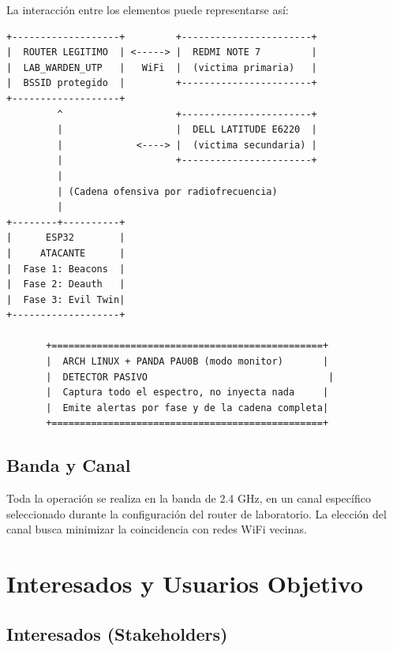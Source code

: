 \documentclass[11pt,a4paper]{article}
\begin{document}
La interacción entre los elementos puede representarse así:

\vspace{0.3cm}
\begin{verbatim}
+-------------------+         +-----------------------+
|  ROUTER LEGITIMO  | <-----> |  REDMI NOTE 7         |
|  LAB_WARDEN_UTP   |   WiFi  |  (victima primaria)   |
|  BSSID protegido  |         +-----------------------+
+-------------------+
         ^                    +-----------------------+
         |                    |  DELL LATITUDE E6220  |
         |             <----> |  (victima secundaria) |
         |                    +-----------------------+
         |
         | (Cadena ofensiva por radiofrecuencia)
         |
+--------+----------+
|      ESP32        |
|     ATACANTE      |
|  Fase 1: Beacons  |
|  Fase 2: Deauth   |
|  Fase 3: Evil Twin|
+-------------------+

       +================================================+
       |  ARCH LINUX + PANDA PAU0B (modo monitor)       |
       |  DETECTOR PASIVO                                |
       |  Captura todo el espectro, no inyecta nada     |
       |  Emite alertas por fase y de la cadena completa|
       +================================================+
\end{verbatim}

\subsection{Banda y Canal}

Toda la operación se realiza en la banda de 2.4 GHz, en un canal específico
seleccionado durante la configuración del router de laboratorio. La elección
del canal busca minimizar la coincidencia con redes WiFi vecinas.

\section{Interesados y Usuarios Objetivo}

\subsection{Interesados (Stakeholders)}
\end{document}

